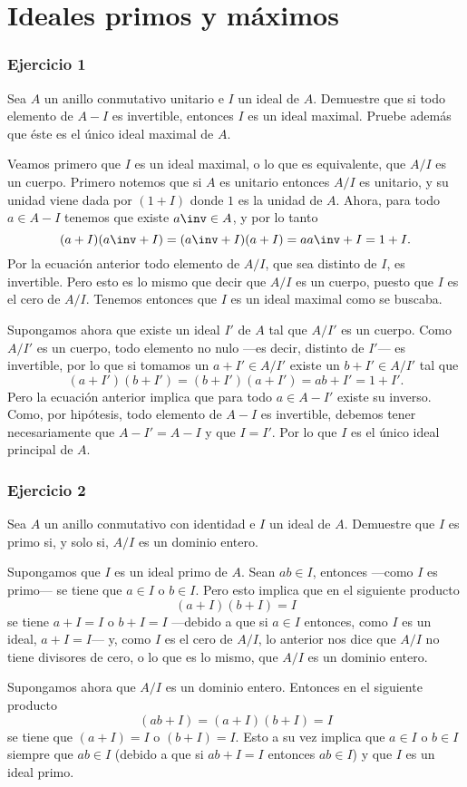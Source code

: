

	\thispagestyle{plain}
\chapter*{Ideales primos y máximos}
\subsection*{Ejercicio 1}
	Sea $A$ un anillo conmutativo unitario e $I$ un ideal de $A$. Demuestre
que si todo elemento de $A - I$ es invertible, entonces $I$ es un ideal
maximal. Pruebe además que éste es el único ideal maximal de $A$.
\begin{sol}
	Veamos primero que $I$ es un ideal maximal, o lo que es equivalente, que $A/I$ es un cuerpo. Primero notemos que si $A$ es unitario entonces $A/I$ es unitario, y su unidad viene dada por $(1+I)$ donde $1$ es la unidad de $A$. Ahora, para todo $a\in A-I$ tenemos que existe $a\inv\in A$, y por lo tanto 
	\[ (a+I)(a\inv +I) = (a\inv+I)(a+I) = aa\inv+I = 1+I. \]
	Por la ecuación anterior todo elemento de $A/I$, que sea distinto de $I$, es invertible. Pero esto es lo mismo que decir que $A/I$ es un cuerpo, puesto que $I$ es el cero de $A/I$. Tenemos entonces que $I$ es un ideal maximal como se buscaba.
	
	Supongamos ahora que existe un ideal $I'$ de $A$ tal que $A/I'$ es un cuerpo. Como $A/I'$ es un cuerpo, todo elemento no nulo ---es decir, distinto de $I'$--- es invertible, por lo que si tomamos un $a+I'\in A/I'$ existe un $b+I'\in A/I'$ tal que
	\[ (a+I')(b+I') = (b+I')(a+I') = ab+I' = 1+I'. \]
	Pero la ecuación anterior implica que para todo $a\in A-I'$ existe su inverso. Como, por hipótesis, todo elemento de $A-I$ es invertible, debemos tener necesariamente que $A-I'=A-I$ y que $I=I'$. Por lo que $I$ es el único ideal principal de $A$. 
\end{sol}
\subsection*{Ejercicio 2}
Sea $A$ un anillo conmutativo con identidad e $I$ un ideal de $A$. Demuestre
que $I$ es primo si, y solo si, $A/I$ es un dominio entero.
\begin{sol}
	Supongamos que $I$ es un ideal primo de $A$. Sean $ab\in I$, entonces ---como $I$ es primo--- se tiene que $a\in I$ o $b\in I$. Pero esto implica que en el siguiente producto
	\[ (a+I)(b+I) = I \]
	se tiene $a+I = I$ o $b+I = I$ ---debido a que si $a\in I$ entonces, como $I$ es un ideal, $a+I=I$--- y, como $I$ es el cero de $A/I$, lo anterior nos dice que $A/I$ no tiene divisores de cero, o lo que es lo mismo, que $A/I$ es un dominio entero.
	
	Supongamos ahora que $A/I$ es un dominio entero. Entonces en el siguiente producto
	\[ (ab+I) = (a+I)(b+I) = I \]
	se tiene que $(a+I) = I$ o $(b+I) = I$. Esto a su vez implica que $a\in I$ o $b\in I$ siempre que $ab\in I$ (debido a que si $ab+I = I$ entonces $ab\in I$) y que $I$ es un ideal primo.
\end{sol}
